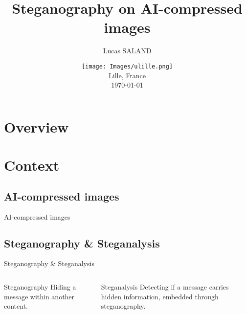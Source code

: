 \documentclass[11pt,compress]{beamer} %
\begin{document}
\title[]{Steganography on AI-compressed images}
\author{Lucas \textsc{SALAND}}
\date[\today]{\texttt{[image: Images/ulille.png]} \medskip \\ Lille, France \medskip \\ \today}

\frame{\titlepage}

\section*{Overview}
\begin{frame}
  \tableofcontents
\end{frame}

\section{Context}
\subsection{AI-compressed images}
\begin{frame}{AI-compressed images}
\end{frame}

\subsection{Steganography \& Steganalysis}

\begin{frame}{Steganography \& Steganalysis}
  \begin{columns}
    \begin{column}{0.4\textwidth}
      \begin{block}{Steganography}
        Hiding a message within another content.
      \end{block}
    \end{column}
    \begin{column}{0.45\textwidth}
      \begin{block}{Steganalysis}
        Detecting if a message carries hidden information, embedded through steganography.
      \end{block}
    \end{column}
  \end{columns}
\end{frame}
\end{document}
